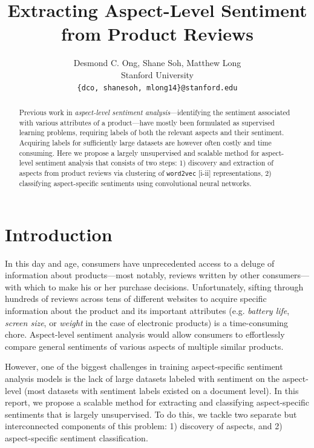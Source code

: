 \documentclass{article} %
\title{  Extracting Aspect-Level Sentiment from Product Reviews  }
\author{
Desmond C. Ong, Shane Soh, Matthew Long \\
Stanford University \\
\texttt{\{dco, shanesoh, mlong14\}@stanford.edu}
}
\begin{document}
\maketitle

\begin{abstract}
Previous work in \textit{aspect-level sentiment analysis}---identifying the sentiment associated with various attributes of a product---have mostly been formulated as supervised learning problems, requiring labels of both the relevant aspects and their sentiment. Acquiring labels for sufficiently large datasets are however often costly and time consuming. Here we propose a largely unsupervised and scalable method for aspect-level sentiment analysis that consists of two steps: 1) discovery and extraction of aspects from product reviews via clustering of \texttt{word2vec} [i-ii] representations, 2) classifying aspect-specific sentiments using convolutional neural networks.
\end{abstract}

\section{Introduction}

In this day and age, consumers have unprecedented access to a deluge of information about products---most notably, reviews written by other consumers---with which to make his or her purchase decisions. Unfortunately, sifting through hundreds of reviews across tens of different websites to acquire specific information about the product and its important attributes (e.g. \textit{battery life}, \textit{screen size}, or \textit{weight} in the case of electronic products) is a time-consuming chore. Aspect-level sentiment analysis would allow consumers to effortlessly compare general sentiments of various aspects of multiple similar products.

However, one of the biggest challenges in training aspect-specific sentiment analysis models is the lack of large datasets labeled with sentiment on the aspect-level (most datasets with sentiment labels existed on a document level). In this report, we propose a scalable method for extracting and classifying aspect-specific sentiments that is largely unsupervised. To do this, we tackle two separate but interconnected components of this problem: 1) discovery of aspects, and 2) aspect-specific sentiment classification.
\end{document}
